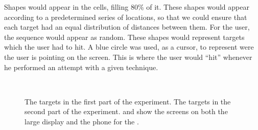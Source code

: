 Shapes would appear in the cells, filling 80\% of it. 
These shapes would appear according to a predetermined series of locations, so that we could ensure that each target had an equal distribution of distances between them. 
For the user, the sequence would appear as random. 
These shapes would represent targets which the user had to hit.
A blue circle was used, as a cursor, to represent were the user is pointing on the screen.
This is where the user would ``hit'' whenever he performed an attempt with a given technique.

\begin{figure}[H]
	\begin{minipage}[c]{.12\columnwidth}
	\centering
	\\
	\end{minipage}%
	\hspace{0.01\columnwidth}
	\begin{minipage}[c]{.88\columnwidth}
	\centering
	\hspace{0.01\columnwidth}
	\end{minipage}
	\caption{\protect{} The targets in the first part of the experiment. \protect{} The targets in the second part of the experiment. \protect{} and \protect{} show the screens on both the large display and the phone for the \accuracy.}
\end{figure}

